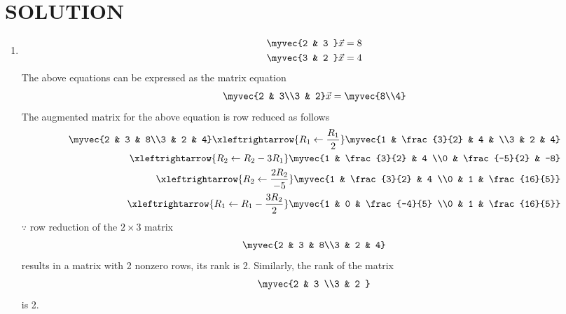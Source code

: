 \documentclass[journal,12pt,twocolumn]{IEEEtran}
\begin{document}
\section{SOLUTION}  
\begin{enumerate}
\item
\begin{align}
\begin{split}
\myvec{2 & 3 }\vec{x}&=8
\\
\myvec{3 & 2 }\vec{x}&=4
\end{split}
\end{align}
The above equations can be expressed as the matrix equation
\begin{align}
\myvec{2 & 3\\3 & 2} \vec{x} = \myvec{8\\4}
\end{align}
%
The augmented matrix for the above equation is row reduced as follows
\begin{align}
\myvec{2 & 3 & 8\\3 & 2 & 4} 
\xleftrightarrow {R_1\leftarrow \frac{R_1}{2}}\myvec{1 & \frac{3}{2} & 4 & \\3 & 2 & 4} 
\\
\xleftrightarrow {R_2\leftarrow R_2-3R_1}\myvec{1 & \frac{3}{2} & 4 \\0 & \frac{-5}{2} & -8}
\\
\xleftrightarrow {R_2\leftarrow \frac{2R_2}{-5}}\myvec{1 & \frac{3}{2} & 4 \\0 & 1 & \frac{16}{5}}
\\
\xleftrightarrow {R_1\leftarrow  R_1-\frac {3R_2}{2}}\myvec{1 & 0 & \frac{-4}{5} \\0 & 1 & \frac{16}{5}}
\end{align}
%
$\because$ row reduction of the $2\times 3$ matrix
%
\begin{align}
\myvec{2 & 3 & 8\\3 & 2 & 4} \label{2.0.7}
\end{align}
%
results in a matrix with 2 nonzero rows, its rank is 2. 
%
Similarly, the rank of the matrix 
\begin{align}
\myvec{2 & 3 \\3 & 2 } \label{2.0.8}
\end{align}
%
is 2.

\end{enumerate}
\end{document}
